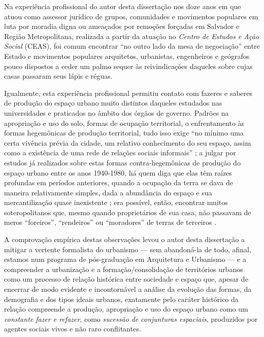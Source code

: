 Na experiência profissional do autor desta dissertação nos doze anos em que atuou como assessor jurídico de grupos, comunidades e movimentos populares em luta por moradia digna ou ameaçados por remoções forçadas em Salvador e Região Metropolitana, realizada a partir da atuação no \textit{Centro de Estudos e Ação Social} (CEAS), foi comum encontrar ``no outro lado da mesa de negociação'' entre Estado e movimentos populares arquitetos, urbanistas, engenheiros e geógrafos pouco dispostos a ceder um palmo sequer às reivindicações daqueles sobre cujas casas passaram seus lápis e réguas.

Igualmente, esta experiência profissional permitiu contato com fazeres e saberes de produção do espaço urbano muito distintos daqueles estudados nas universidades e praticados no âmbito dos órgãos de governo. Padrões na apropriação e uso do solo, formas de ocupação territorial, o enfrentamento às formas hegemônicas de produção territorial, tudo isso exige ``no mínimo uma certa vivência prévia da cidade, um relativo conhecimento do seu espaço, assim como a existência de uma rede de relações sociais informais'' \cite[p.~40]{MATTEDI1981}; a julgar por estudos já realizados sobre estas formas contra-hegemônicas de produção do espaço urbano entre os anos 1940-1980, há quem diga que elas têm raízes profundas em períodos anteriores, quando a ocupação da terra se dava de maneira relativamente simples, dada a abundância do espaço e sua mercantilização quase inexistente \cite[p.~25]{MOURA1990}; era possível, então, encontrar muitos soteropolitanos que, mesmo quando proprietários de sua casa, não passavam de meros ``foreiros'', ``rendeiros'' ou ``moradores'' de terras de terceiros \cite[p.~139]{BRANDAO1980}.

A comprovação empírica destas observações levou o autor desta dissertação a mitigar a vertente formalista do urbanismo --- sem abandoná-la de todo, afinal, estamos num programa de pós-graduação em Arquitetura e Urbanismo --- e a compreender a urbanização e a formação/consolidação de territórios urbanos como um processo de relação histórica entre sociedade e espaço \cite{CASTELLS2000, SANTOS2008} que, apesar de encerrar de modo evidente e incontornável a análise da evolução das formas, da demografia e dos tipos ideais urbanos, exatamente pelo caráter histórico da relação compreende a produção, apropriação e uso do espaço urbano como um \textit{constante fazer e refazer}, como \textit{sucessão de conjunturas espaciais}, produzidos por agentes sociais vivos e não raro conflitantes.

